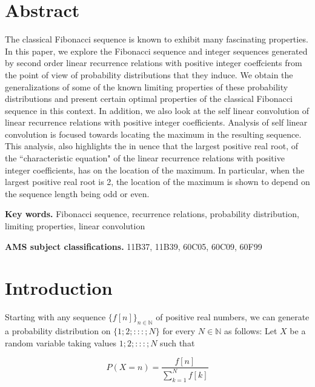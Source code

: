 \begin{multicols}{2}

\section*{Abstract}

The classical Fibonacci sequence is known to exhibit many fascinating properties. In this paper, we explore the Fibonacci sequence and integer sequences generated by second order linear recurrence relations with positive integer coeffcients from the point of view of probability distributions that they induce. We obtain the generalizations of some of the known limiting properties of these probability distributions and present certain optimal properties of the classical Fibonacci sequence in this context. In addition, we also look at the self linear convolution of linear recurrence relations with positive integer coefficients. Analysis of self linear convolution is focused towards locating the maximum in the resulting sequence. This analysis, also highlights the in uence that the largest positive real root, of the ``characteristic equation" of the linear recurrence relations with positive integer coefficients, has on the location of the maximum. In particular, when the largest positive real root is 2, the location of the maximum is shown to depend on the sequence length being odd or even.

\textbf{Key words.} Fibonacci sequence, recurrence relations, probability distribution, limiting properties, linear convolution

\textbf{AMS subject classifications.} 11B37, 11B39, 60C05, 60C09, 60F99

\vspace{-.3cm}

\section{Introduction}\label{section-1}

\vspace{-.2cm}

Starting with any sequence $\{f[n]\}_{n\in \mathbb N}$ of positive real numbers, we can generate a probability distribution on $\{1; 2; : : : ;N\}$ for every $N \in \mathbb N$ as follows: Let $X$ be a random variable taking values $1; 2; : : : ;N$ such that

\vspace{-.2cm}

$$
P(X=n) = \displaystyle{\frac{f[n]}{\displaystyle{\sum_{k=1}^N}f[k]}}
$$


\end{multicols}
